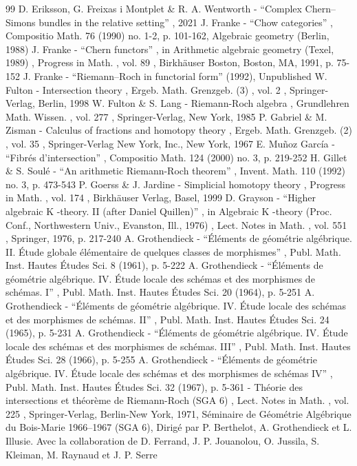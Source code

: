 \documentclass[11pt]{article}
\theoremstyle{plain}
\theoremstyle{definition}
\begin{document}
\begin{thebibliography}{99}
 D. Eriksson, G. Freixas i Montplet \& R. A. Wentworth - “Complex Chern–Simons bundles in the relative setting” , 2021
 J. Franke - “Chow categories” , Compositio Math. 76 (1990) no. 1-2, p. 101-162, Algebraic geometry (Berlin, 1988)
 J. Franke - “Chern functors” , in Arithmetic algebraic geometry (Texel, 1989) , Progress in Math. , vol. 89 , Birkhäuser Boston, Boston, MA, 1991, p. 75-152
 J. Franke - “Riemann–Roch in functorial form” (1992), Unpublished
 W. Fulton - Intersection theory , Ergeb. Math. Grenzgeb. (3) , vol. 2 , Springer-Verlag, Berlin, 1998
 W. Fulton \& S. Lang - Riemann-Roch algebra , Grundlehren Math. Wissen. , vol. 277 , Springer-Verlag, New York, 1985
 P. Gabriel \& M. Zisman - Calculus of fractions and homotopy theory , Ergeb. Math. Grenzgeb. (2) , vol. 35 , Springer-Verlag New York, Inc., New York, 1967
 E. Muñoz García - “Fibrés d’intersection” , Compositio Math. 124 (2000) no. 3, p. 219-252
 H. Gillet \& S. Soulé - “An arithmetic Riemann-Roch theorem” , Invent. Math. 110 (1992) no. 3, p. 473-543
 P. Goerss \& J. Jardine - Simplicial homotopy theory , Progress in Math. , vol. 174 , Birkhäuser Verlag, Basel, 1999
 D. Grayson - “Higher algebraic K -theory. II (after Daniel Quillen)” , in Algebraic K -theory (Proc. Conf., Northwestern Univ., Evanston, Ill., 1976) , Lect. Notes in Math. , vol. 551 , Springer, 1976, p. 217-240
 A. Grothendieck - “Éléments de géométrie algébrique. II. Étude globale élémentaire de quelques classes de morphismes” , Publ. Math. Inst. Hautes Études Sci. 8 (1961), p. 5-222
 A. Grothendieck - “Éléments de géométrie algébrique. IV. Étude locale des schémas et des morphismes de schémas. I” , Publ. Math. Inst. Hautes Études Sci. 20 (1964), p. 5-251
 A. Grothendieck - “Éléments de géométrie algébrique. IV. Étude locale des schémas et des morphismes de schémas. II” , Publ. Math. Inst. Hautes Études Sci. 24 (1965), p. 5-231
 A. Grothendieck - “Éléments de géométrie algébrique. IV. Étude locale des schémas et des morphismes de schémas. III” , Publ. Math. Inst. Hautes Études Sci. 28 (1966), p. 5-255
 A. Grothendieck - “Éléments de géométrie algébrique. IV. Étude locale des schémas et des morphismes de schémas IV” , Publ. Math. Inst. Hautes Études Sci. 32 (1967), p. 5-361
 - Théorie des intersections et théorème de Riemann-Roch (SGA 6) , Lect. Notes in Math. , vol. 225 , Springer-Verlag, Berlin-New York, 1971, Séminaire de Géométrie Algébrique du Bois-Marie 1966–1967 (SGA 6), Dirigé par P. Berthelot, A. Grothendieck et L. Illusie. Avec la collaboration de D. Ferrand, J. P. Jouanolou, O. Jussila, S. Kleiman, M. Raynaud et J. P. Serre

\end{thebibliography}
\end{document}
